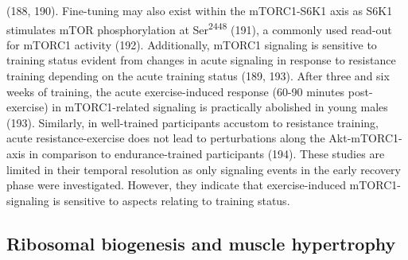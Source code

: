 \documentclass[twoside,10pt]{gihclass} %
\begin{document}
(188, 190).
Fine-tuning may also exist within the mTORC1-S6K1 axis as S6K1 stimulates mTOR phosphorylation at Ser\textsuperscript{2448}
(191),
a commonly used read-out for mTORC1 activity
(192).
Additionally, mTORC1 signaling is sensitive to training status evident from changes in acute signaling in response to resistance training depending on the acute training status
(189, 193).
After three and six weeks of training, the acute exercise-induced response (60-90 minutes post-exercise) in mTORC1-related signaling is practically abolished in young males
(193).
Similarly, in well-trained participants accustom to resistance training, acute resistance-exercise does not lead to perturbations along the Akt-mTORC1-axis in comparison to endurance-trained participants
(194).
These studies are limited in their temporal resolution as only signaling events in the early recovery phase were investigated.
However, they indicate that exercise-induced mTORC1-signaling is sensitive to aspects relating to training status.

\hypertarget{ribosomal-biogenesis-and-muscle-hypertrophy}{%
\subsection{Ribosomal biogenesis and muscle hypertrophy}\label{ribosomal-biogenesis-and-muscle-hypertrophy}}
\end{document}
